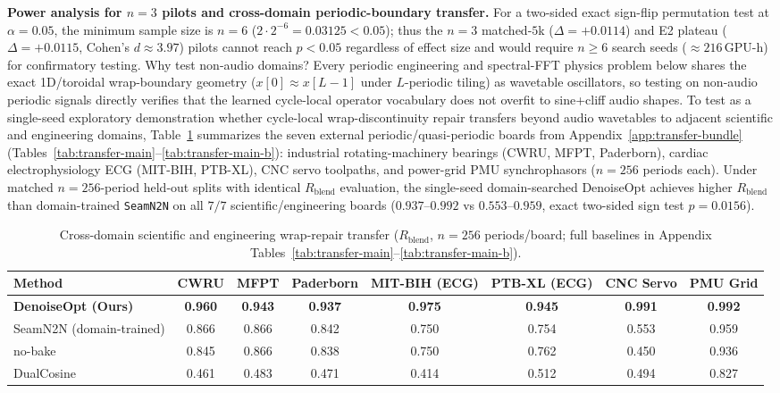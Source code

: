 \textbf{Power analysis for $n{=}3$ pilots and cross-domain periodic-boundary transfer.}
For a two-sided exact sign-flip permutation test at $\alpha{=}0.05$, the minimum sample size is $n{=}6$ ($2\cdot 2^{-6}{=}0.03125<0.05$); thus the $n{=}3$ matched-$5$k ($\Delta{=}{+}0.0114$) and E2 plateau ($\Delta{=}{+}0.0115$, Cohen's $d{\approx}3.97$) pilots cannot reach $p{<}0.05$ regardless of effect size and would require $n{\ge}6$ search seeds (${\approx}216$\,GPU-h) for confirmatory testing.
Why test non-audio domains? Every periodic engineering and spectral-FFT physics problem below shares the exact 1D/toroidal wrap-boundary geometry ($x[0]{\approx}x[L{-}1]$ under $L$-periodic tiling) as wavetable oscillators, so testing on non-audio periodic signals directly verifies that the learned cycle-local operator vocabulary does not overfit to sine+cliff audio shapes.
To test as a single-seed exploratory demonstration whether cycle-local wrap-discontinuity repair transfers beyond audio wavetables to adjacent scientific and engineering domains, Table~\ref{tab:transfer-summary-main} summarizes the seven external periodic/quasi-periodic boards from Appendix~\ref{app:transfer-bundle} (Tables~\ref{tab:transfer-main}--\ref{tab:transfer-main-b}): industrial rotating-machinery bearings (CWRU, MFPT, Paderborn), cardiac electrophysiology ECG (MIT-BIH, PTB-XL), CNC servo toolpaths, and power-grid PMU synchrophasors ($n{=}256$ periods each). Under matched $n{=}256$-period held-out splits with identical $R_{\mathrm{blend}}$ evaluation, the single-seed domain-searched DenoiseOpt achieves higher $R_{\mathrm{blend}}$ than domain-trained \texttt{SeamN2N} on all $7/7$ scientific/engineering boards ($0.937$--$0.992$ vs $0.553$--$0.959$, exact two-sided sign test $p{=}0.0156$).

\begin{table}[t]
  \centering
  \small
  \caption{Cross-domain scientific and engineering wrap-repair transfer ($R_{\mathrm{blend}}$, $n{=}256$ periods/board; full baselines in Appendix Tables~\ref{tab:transfer-main}--\ref{tab:transfer-main-b}).}
  \label{tab:transfer-summary-main}
  \setlength{\tabcolsep}{5pt}
  \begin{tabular}{@{}lccccccc@{}}
    \toprule
    Method & CWRU & MFPT & Paderborn & MIT-BIH (ECG) & PTB-XL (ECG) & CNC Servo & PMU Grid \\
    \midrule
    \textbf{DenoiseOpt (Ours)} & \textbf{0.960} & \textbf{0.943} & \textbf{0.937} & \textbf{0.975} & \textbf{0.945} & \textbf{0.991} & \textbf{0.992} \\
    SeamN2N (domain-trained) & 0.866 & 0.866 & 0.842 & 0.750 & 0.754 & 0.553 & 0.959 \\
    no-bake & 0.845 & 0.866 & 0.838 & 0.750 & 0.762 & 0.450 & 0.936 \\
    DualCosine & 0.461 & 0.483 & 0.471 & 0.414 & 0.512 & 0.494 & 0.827 \\
    \bottomrule
  \end{tabular}
\end{table}

